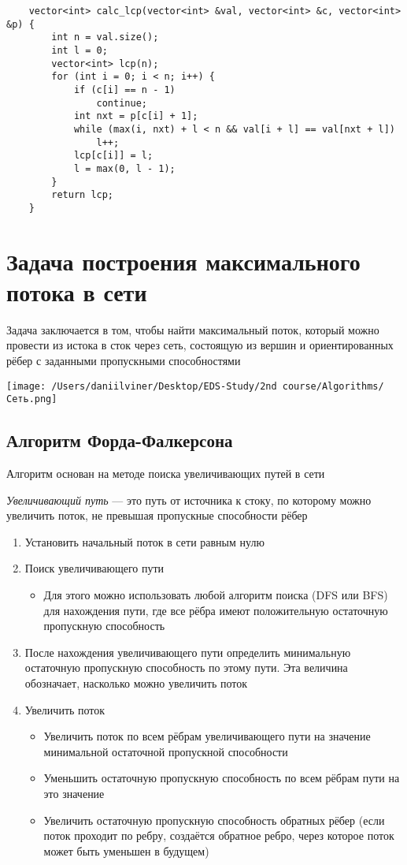 \documentclass[a4paper]{article}
\begin{document}
\begin{lstlisting}
    vector<int> calc_lcp(vector<int> &val, vector<int> &c, vector<int> &p) {
        int n = val.size();
        int l = 0;
        vector<int> lcp(n);
        for (int i = 0; i < n; i++) {
            if (c[i] == n - 1)
                continue;
            int nxt = p[c[i] + 1];
            while (max(i, nxt) + l < n && val[i + l] == val[nxt + l])
                l++;
            lcp[c[i]] = l;
            l = max(0, l - 1);
        }
        return lcp;
    }
\end{lstlisting}

\newpage
\section{Задача построения максимального потока в сети}
Задача заключается в том, чтобы найти максимальный поток, который можно провести из истока в сток через сеть, состоящую из вершин и ориентированных рёбер с заданными пропускными способностями

\begin{center}
    \texttt{[image: /Users/daniilviner/Desktop/EDS-Study/2nd course/Algorithms/Сеть.png]}
\end{center}
\subsection{Алгоритм Форда-Фалкерсона}
Алгоритм основан на методе поиска увеличивающих путей в сети

 \textit{Увеличивающий путь} — это путь от источника к стоку, по которому можно увеличить поток, не превышая пропускные способности рёбер

\begin{enumerate}
    \item Установить начальный поток в сети равным нулю
    \item Поиск увеличивающего пути
    \begin{itemize}
        \item Для этого можно использовать любой алгоритм поиска (DFS или BFS) для нахождения пути, где все рёбра имеют положительную остаточную пропускную способность
    \end{itemize}
    \item После нахождения увеличивающего пути определить минимальную остаточную пропускную способность по этому пути. Эта величина обозначает, насколько можно увеличить поток
    \item Увеличить поток
    \begin{itemize}
        \item Увеличить поток по всем рёбрам увеличивающего пути на значение минимальной остаточной пропускной способности
        \item Уменьшить остаточную пропускную способность по всем рёбрам пути на это значение
        \item Увеличить остаточную пропускную способность обратных рёбер (если поток проходит по ребру, создаётся обратное ребро, через которое поток может быть уменьшен в будущем)
    \end{itemize}
\end{enumerate}
\end{document}
